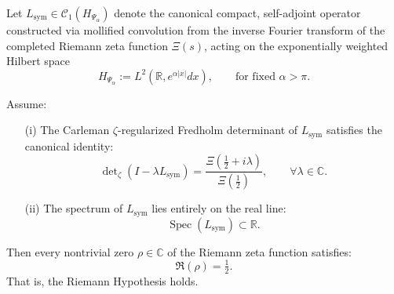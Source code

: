 \begin{lemma}
\label{lem:real-spectrum-implies-rh}
Let \( L_{\mathrm{sym}} \in \mathcal{C}_1(H_{\Psi_\alpha}) \) denote the canonical compact, self-adjoint operator constructed via mollified convolution from the inverse Fourier transform of the completed Riemann zeta function \( \Xi(s) \), acting on the exponentially weighted Hilbert space
\[
H_{\Psi_\alpha} := L^2(\mathbb{R}, e^{\alpha |x|} dx), \qquad \text{for fixed } \alpha > \pi.
\]

Assume:
\begin{enumerate}
  \item[\textnormal{(i)}] The Carleman \(\zeta\)-regularized Fredholm determinant of \( L_{\mathrm{sym}} \) satisfies the canonical identity:
  \[
  \det\nolimits_{\zeta}(I - \lambda L_{\mathrm{sym}}) = \frac{\Xi\left(\tfrac{1}{2} + i\lambda\right)}{\Xi\left(\tfrac{1}{2}\right)}, \qquad \forall \lambda \in \mathbb{C}.
  \]

  \item[\textnormal{(ii)}] The spectrum of \( L_{\mathrm{sym}} \) lies entirely on the real line:
  \[
  \operatorname{Spec}(L_{\mathrm{sym}}) \subset \mathbb{R}.
  \]
\end{enumerate}

Then every nontrivial zero \( \rho \in \mathbb{C} \) of the Riemann zeta function satisfies:
\[
\Re(\rho) = \tfrac{1}{2}.
\]
That is, the Riemann Hypothesis holds.
\end{lemma}
